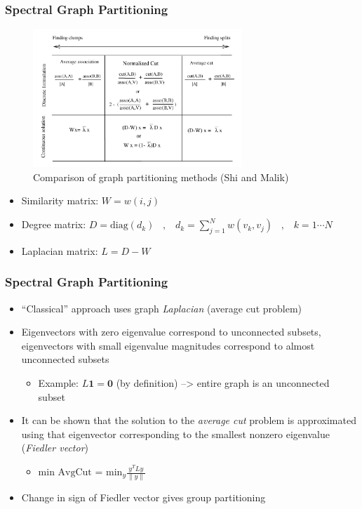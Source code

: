 \documentclass[9pt]{beamer}
\newcommand{\bv}[1]{\mathbf{#1}}
\begin{document}
\begin{frame}
\frametitle{Spectral Graph Partitioning}
\label{sec-2-4}

\vspace*{-0.0cm}\begin{figure}
    \includegraphics[width=0.7\textwidth]{GraphPartitionMethods.png}
    \caption{Comparison of graph partitioning methods (Shi and Malik)}
\end{figure}
\begin{itemize}
\item Similarity matrix: $W = w(i,j)$
\item Degree matrix: $D = \text{diag}(d_k) \;\;\; , \;\;\; d_k = \sum_{j=1}^N w(v_k,v_j) \;\;\; , \;\;\; k=1 \cdots N$
\item Laplacian matrix: $L = D - W$
\end{itemize}
\end{frame}
\begin{frame}
\frametitle{Spectral Graph Partitioning}
\label{sec-2-5}

\begin{itemize}
\item ``Classical'' approach uses graph \emph{Laplacian} (average cut problem)
\item Eigenvectors with zero eigenvalue correspond to unconnected subsets,
  eigenvectors with small eigenvalue magnitudes correspond to almost
  unconnected subsets
\begin{itemize}
\item Example: $L \bv{1} = \bv{0}$ (by definition) --> entire graph is an unconnected subset
\end{itemize}
\item It can be shown that the solution to the \emph{average cut} problem is
  approximated using that eigenvector corresponding to the smallest
  nonzero eigenvalue (\emph{Fiedler vector})
\begin{itemize}
\item $\text{min AvgCut}$ = $\text{min}_y \frac{y^T L y}{\| y \|}$
\end{itemize}
\item Change in sign of Fiedler vector gives group partitioning
\end{itemize}
\end{frame}
\end{document}

